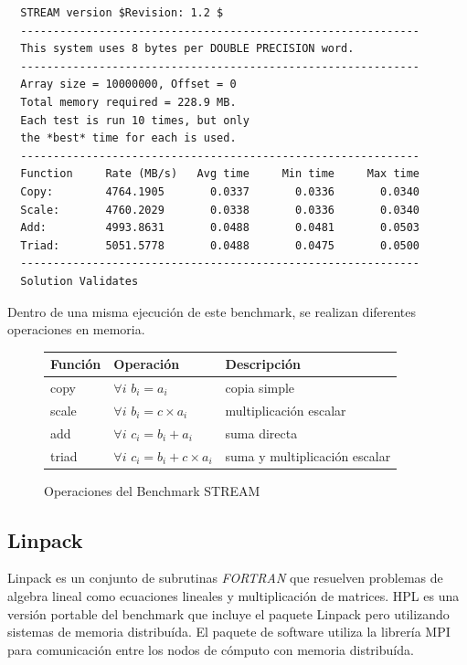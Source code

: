 \documentclass[a4paper]{report}
\begin{document}
\begin{verbatim}
  STREAM version $Revision: 1.2 $
  -------------------------------------------------------------
  This system uses 8 bytes per DOUBLE PRECISION word.
  -------------------------------------------------------------
  Array size = 10000000, Offset = 0
  Total memory required = 228.9 MB.
  Each test is run 10 times, but only
  the *best* time for each is used.
  -------------------------------------------------------------
  Function     Rate (MB/s)   Avg time     Min time     Max time
  Copy:        4764.1905       0.0337       0.0336       0.0340
  Scale:       4760.2029       0.0338       0.0336       0.0340
  Add:         4993.8631       0.0488       0.0481       0.0503
  Triad:       5051.5778       0.0488       0.0475       0.0500
  -------------------------------------------------------------
  Solution Validates
\end{verbatim}

Dentro de una misma ejecuci\'on de este benchmark, se realizan diferentes
operaciones en memoria.

\begin{figure}[H]
  \begin{center}
    \begin{tabular}{|l|l|l|}\hline
      {\bf Funci\'on} & {\bf Operaci\'on} & {\bf Descripci\'on} \\ \hline
      copy & $ \forall i $ $ b_{i} = a_{i} $ & copia simple \\ \hline
      scale & $ \forall i $ $ b_{i} = c \times a_{i} $ & multiplicaci\'on escalar \\ \hline
      add & $ \forall i $ $ c_{i} = b_{i} + a_{i} $ & suma directa \\ \hline
      triad & $ \forall i $ $ c_{i} = b_{i} + c \times a_{i} $ & suma y multiplicaci\'on escalar \\ \hline
    \end{tabular}
    \caption{Operaciones del Benchmark STREAM}
  \end{center}
  \label{stream}
\end{figure}

\subsection{Linpack}

Linpack \cite{linpack} es un conjunto de subrutinas {\it FORTRAN} que resuelven
problemas de algebra lineal como ecuaciones lineales y multiplicaci\'on de
matrices. HPL \cite{hpl} es una versi\'on portable del benchmark que incluye
el paquete Linpack pero utilizando sistemas de memoria distribu\'ida. El
paquete de software utiliza la librer\'ia MPI para comunicaci\'on entre los
 nodos de c\'omputo con memoria distribu\'ida.
\end{document}
